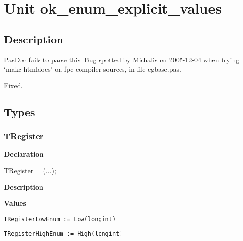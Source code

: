 \documentclass{report}
\newif\ifpdf
\begin{document}
\label{toc}\tableofcontents
\newpage
\newlength{\tmplength}
\chapter{Unit ok{\_}enum{\_}explicit{\_}values}
\label{ok_enum_explicit_values}
\section{Description}
PasDoc fails to parse this. Bug spotted by Michalis on 2005{-}12{-}04 when trying `make htmldocs' on fpc compiler sources, in file cgbase.pas.

Fixed.
\section{Types}
\ifpdf
\subsection*{\large{\textbf{TRegister}}\normalsize\hspace{1ex}\hrulefill}
\else
\subsection*{TRegister}
\fi
\label{ok_enum_explicit_values-TRegister}
\begin{list}{}{
\setlength{\itemindent}{0cm}
\setlength{\listparindent}{0cm}
\setlength{\leftmargin}{\evensidemargin}
\addtolength{\leftmargin}{\tmplength}
\settowidth{\labelsep}{X}
\addtolength{\leftmargin}{\labelsep}
\setlength{\labelwidth}{\tmplength}
}
\item[\textbf{Declaration}\hfill]
\ifpdf
\begin{flushleft}
\fi
\begin{ttfamily}
TRegister = (...);\end{ttfamily}

\ifpdf
\end{flushleft}
\fi

\par
\item[\textbf{Description}]
 \item[\textbf{Values}]
\begin{description}
\item[\texttt{TRegisterLowEnum := Low(longint)}] \label{ok_enum_explicit_values-TRegisterLowEnum}
\index{}
 
\item[\texttt{TRegisterHighEnum := High(longint)}] \label{ok_enum_explicit_values-TRegisterHighEnum}
\index{}
 
\end{description}


\end{list}
\end{document}

